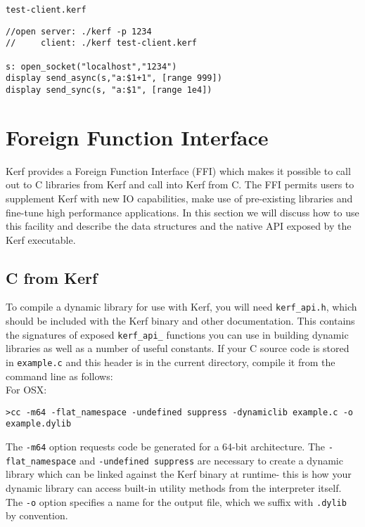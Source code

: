 \documentclass{article}
\begin{document}
\texttt{test-client.kerf}
\begin{Verbatim}
//open server: ./kerf -p 1234
//     client: ./kerf test-client.kerf 

s: open_socket("localhost","1234")
display send_async(s,"a:$1+1", [range 999])
display send_sync(s, "a:$1", [range 1e4])
\end{Verbatim}


\pagebreak
\section {Foreign Function Interface}\label{sec:ffi}
Kerf provides a Foreign Function Interface (FFI) which makes it possible to call out to C libraries from Kerf and call into Kerf from C. The FFI permits users to supplement Kerf with new IO capabilities, make use of pre-existing libraries and fine-tune high performance applications. In this section we will discuss how to use this facility and describe the data structures and the native API exposed by the Kerf executable.

\subsection{C from Kerf}

To compile a dynamic library for use with Kerf, you will need \texttt{kerf\_api.h}, which should be included with the Kerf binary and other documentation. This contains the signatures of exposed \texttt{kerf\_api\_} functions you can use in building dynamic libraries as well as a number of useful constants. If your C source code is stored in \texttt{example.c} and this header is in the current directory, compile it from the command line as follows:\\

For OSX:
\begin{Verbatim}
>cc -m64 -flat_namespace -undefined suppress -dynamiclib example.c -o example.dylib
\end{Verbatim}

The \texttt{-m64} option requests code be generated for a 64-bit architecture. The \texttt{-flat\_namespace} and \texttt{-undefined suppress} are necessary to create a dynamic library which can be linked against the Kerf binary at runtime- this is how your dynamic library can access built-in utility methods from the interpreter itself.  The \texttt{-o} option specifies a name for the output file, which we suffix with \texttt{.dylib} by convention.
\end{document}
